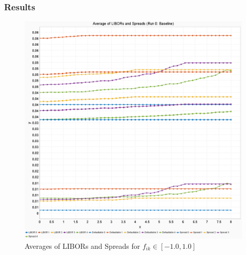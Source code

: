\documentclass{beamer}
\begin{document}
	\begin{frame}
	\frametitle{Results}
	\begin{figure}
		\centering
		\includegraphics[height=0.6\textheight]{VorstellungPics/FreeParamsRange10}
		\caption[]{Averages of LIBORs and Spreads for $f_{i k} \in [-1.0, 1.0]$}
		\label{fig:freeparamsrange10}
	\end{figure}
	
	\end{frame}
	
\end{document}
